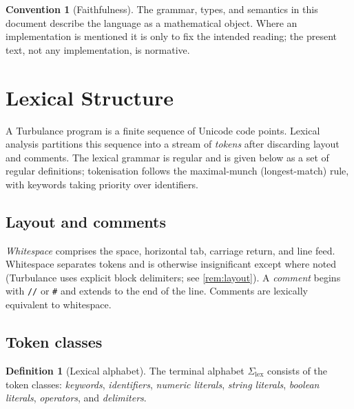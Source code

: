 \documentclass[11pt,a4paper]{article}
\theoremstyle{plain}
\theoremstyle{definition}
\newtheorem{definition}[theorem]{Definition}
\newtheorem{convention}[theorem]{Convention}
\theoremstyle{remark}
\begin{document}
\begin{convention}[Faithfulness]
The grammar, types, and semantics in this document describe the language as a
mathematical object. Where an implementation is mentioned it is only to fix the
intended reading; the present text, not any implementation, is normative.
\end{convention}

\section{Lexical Structure}
\label{sec:lexical}

A Turbulance program is a finite sequence of Unicode code points. Lexical
analysis partitions this sequence into a stream of \emph{tokens} after
discarding layout and comments. The lexical grammar is regular
\citep{kleene1956,thompson1968,hopcroft2006} and is given below as a set of
regular definitions; tokenisation follows the maximal-munch (longest-match)
rule, with keywords taking priority over identifiers.

\subsection{Layout and comments}

\emph{Whitespace} comprises the space, horizontal tab, carriage return, and
line feed. Whitespace separates tokens and is otherwise insignificant except
where noted (Turbulance uses explicit block delimiters; see
\cref{rem:layout}). A \emph{comment} begins with \texttt{//} or \texttt{\#}
and extends to the end of the line. Comments are lexically equivalent to
whitespace.

\subsection{Token classes}

\begin{definition}[Lexical alphabet]
The terminal alphabet $\Sigma_{\mathrm{lex}}$ consists of the token classes:
\emph{keywords}, \emph{identifiers}, \emph{numeric literals}, \emph{string
literals}, \emph{boolean literals}, \emph{operators}, and \emph{delimiters}.
\end{definition}
\end{document}
